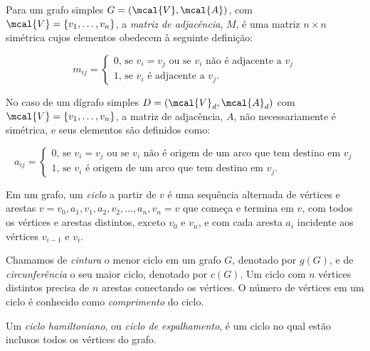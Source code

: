 \begin{mydef}
    Para um grafo simples $G = (\mcal{V}, \mcal{A})$, com $\mcal{V} = \{v_1,\ldots,v_n\}$, a \emph{matriz de adjacência}, $M$, é uma matriz $n \times n$ simétrica cujos elementos obedecem à seguinte definição:

    \begin{equation}
        m_{ij} = 
        \begin{cases}
            0 \text{, se } v_i = v_j \text{ ou se } v_i \text{ não é adjacente a } v_j\\
            1 \text{, se } v_i \text{ é adjacente a } v_j.
        \end{cases}
    \end{equation}

    No caso de um dígrafo simples $D = (\mcal{V}_d, \mcal{A}_d)$ com $\mcal{V} = \{v_1,\ldots,v_n\}$, a matriz de adjacência, $A$, não necessariamente é simétrica, e seus elementos são definidos como:

    \begin{equation}
        a_{ij} = 
        \begin{cases}
            0 \text{, se } v_i = v_j \text{ ou se } v_i \text{ não é origem de um arco que tem destino em } v_j\\
            1 \text{, se } v_i \text{ é origem de um arco que tem destino em } v_j.
        \end{cases}
    \end{equation}
\end{mydef}

\begin{mydef}[Ciclo]
    Em um grafo, um \emph{ciclo} a partir de $v$ é uma sequência alternada de vértices e arestas $v = v_0, a_1, v_1, a_2, v_2, \ldots, a_n, v_n = v$ que começa e termina em $v$, com todos os vértices e arestas distintos, exceto $v_0$ e $v_n$, e com cada aresta $a_i$ incidente aos vértices $v_{i-1}$ e $v_i$.
\end{mydef}

Chamamos de \emph{cintura} o menor ciclo em um grafo $G$, denotado por $g(G)$, e de \emph{circunferência} o seu maior ciclo, denotado por $c(G)$. Um ciclo com $n$ vértices distintos precisa de $n$ arestas conectando os vértices. O número de vértices em um ciclo é conhecido como \emph{comprimento} do ciclo.

\begin{mydef}
    Um \emph{ciclo hamiltoniano}, ou \emph{ciclo de espalhamento}, é um ciclo no qual estão inclusos todos os vértices do grafo.
\end{mydef}


